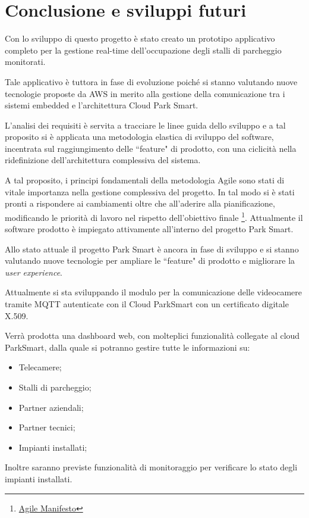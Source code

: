 \chapter{Conclusione e sviluppi futuri}


Con lo sviluppo di questo progetto è stato creato un prototipo applicativo completo per la gestione real-time dell'occupazione degli stalli di parcheggio monitorati. 
\newline

Tale applicativo è tuttora in fase di evoluzione poiché si stanno valutando nuove tecnologie proposte da AWS in merito alla gestione della comunicazione tra i sistemi embedded e l'architettura Cloud Park Smart. 
\newline

L'analisi dei requisiti è servita a tracciare le linee guida dello sviluppo e a tal proposito si è applicata una metodologia elastica di sviluppo del software, incentrata sul raggiungimento delle ``feature" di prodotto, con una ciclicità nella ridefinizione dell'architettura complessiva del sistema.

A tal proposito, i principi fondamentali della metodologia Agile sono stati di vitale importanza nella gestione complessiva del progetto.
In tal modo si è stati pronti a rispondere ai cambiamenti oltre che all'aderire alla pianificazione, modificando le priorità di lavoro nel rispetto dell'obiettivo finale \footnote{\href{http://www.agilemanifesto.org}{Agile Manifesto}}.
Attualmente il software prodotto è impiegato attivamente all'interno del progetto Park Smart.	


Allo stato attuale il progetto Park Smart è ancora in fase di sviluppo e si stanno valutando nuove tecnologie per ampliare le ``feature" di prodotto e migliorare la \textit{user experience}. 

Attualmente si sta sviluppando il modulo per la comunicazione delle videocamere tramite MQTT autenticate con il Cloud ParkSmart con un certificato digitale X.509.
\newline

Verrà prodotta una dashboard web, con molteplici funzionalità collegate al cloud ParkSmart, dalla quale si potranno gestire tutte le informazioni su:
\begin{itemize}
	\item Telecamere;
	\item Stalli di parcheggio;
	\item Partner aziendali;
	\item Partner tecnici;
	\item Impianti installati;
\end{itemize}


Inoltre saranno previste funzionalità di monitoraggio per verificare lo stato degli impianti installati.

